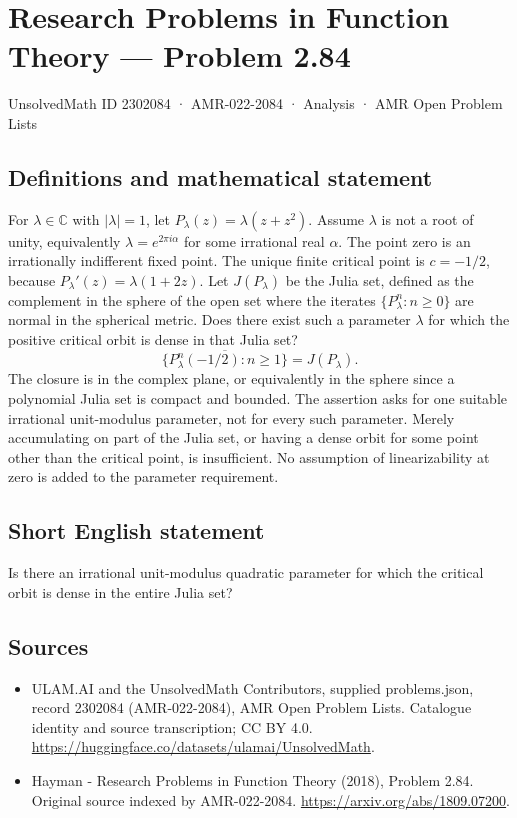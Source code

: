 \documentclass[11pt,a4paper]{article}
\begin{document}
\section*{Research Problems in Function Theory — Problem 2.84}\label{2302084}
{\small UnsolvedMath ID 2302084 · AMR-022-2084 · Analysis · AMR Open Problem Lists}
\subsection{Definitions and mathematical statement}
For $\lambda\in\mathbb C$ with $|\lambda|=1$, let
$P_\lambda(z)=\lambda(z+z^2)$. Assume $\lambda$ is not a root of unity, equivalently $\lambda=e^{2\pi i\alpha}$ for some irrational real $\alpha$. The point zero is an irrationally indifferent fixed point. The unique finite critical point is $c=-1/2$, because $P_\lambda'(z)=\lambda(1+2z)$.
Let $J(P_\lambda)$ be the Julia set, defined as the complement in the sphere of the open set where the iterates $\{P_\lambda^n:n\ge0\}$ are normal in the spherical metric. Does there exist such a parameter $\lambda$ for which the positive critical orbit is dense in that Julia set?
\[
\overline{\{P_\lambda^n(-1/2):n\ge1\}}=J(P_\lambda).
\]
The closure is in the complex plane, or equivalently in the sphere since a polynomial Julia set is compact and bounded. The assertion asks for one suitable irrational unit-modulus parameter, not for every such parameter. Merely accumulating on part of the Julia set, or having a dense orbit for some point other than the critical point, is insufficient. No assumption of linearizability at zero is added to the parameter requirement.
\subsection{Short English statement}
Is there an irrational unit-modulus quadratic parameter for which the critical orbit is dense in the entire Julia set?
\subsection{Sources}
\begin{itemize}
\item[S1] ULAM.AI and the UnsolvedMath Contributors, supplied problems.json, record 2302084 (AMR-022-2084), AMR Open Problem Lists. Catalogue identity and source transcription; CC BY 4.0.
\url{https://huggingface.co/datasets/ulamai/UnsolvedMath}.
\item[S2] Hayman - Research Problems in Function Theory (2018), Problem 2.84. Original source indexed by AMR-022-2084.
\url{https://arxiv.org/abs/1809.07200}.
\end{itemize}
\end{document}
